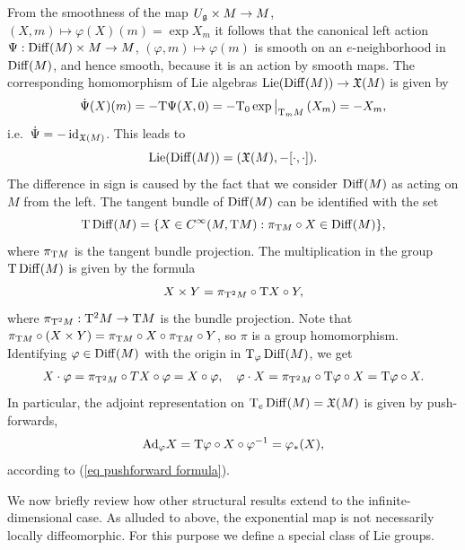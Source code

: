 \begin{example}
    From the smoothness of the map $U_{\mathfrak{g}}\times M\to M$, $(X,m)\mapsto \varphi(X)(m)=\exp X_m$ it follows that the canonical left action $\Psi:\operatorname{Diff}(M)\times M\to M$, $(\varphi,m)\mapsto \varphi(m)$ is smooth on an $e$-neighborhood in $\operatorname{Diff}(M)$, and hence smooth, because it is an action by smooth maps. The corresponding homomorphism of Lie algebras $\operatorname{Lie}(\operatorname{Diff}(M))\to \mathfrak{X}(M)$ is given by
    \[\dot\Psi(X)(m)=-\T\Psi (X,0)=-\T_{0}\restr{\exp}{\T_m M}(X_m)=-X_m,\]
    i.e.\ $\dot\Psi=-\operatorname{id}_{\mathfrak{X}(M)}$. This leads to
    \[\operatorname{Lie} (\operatorname{Diff}(M))=(\mathfrak{X}(M),-[\cdot,\cdot]).\]
    The difference in sign is caused by the fact that we consider $\operatorname{Diff}(M)$ as acting on $M$ from the left. The tangent bundle of $\operatorname{Diff}(M)$ can be identified with the set
    \[\mathrm{T}\operatorname{Diff}(M)=\{X\in C^\infty(M,\mathrm{T} M):\pi_{\mathrm{T} M}\circ X\in \operatorname{Diff}(M)\},\]
    where $\pi_{\mathrm{T} M}$ is the tangent bundle projection. The multiplication in the group $\mathrm{T}\operatorname{Diff}(M)$ is given by the formula
    \[X\times Y=\pi_{\mathrm{T}^2M}\circ \mathrm{T} X\circ Y,\]
    where $\pi_{\mathrm{T}^2M}:\mathrm{T}^2M\to \mathrm{T} M$ is the bundle projection. Note that $\pi_{\mathrm{T} M}\circ (X\times Y)=\pi_{\mathrm{T} M}\circ X\circ \pi_{\mathrm{T} M}\circ Y$, so $\pi$ is a group homomorphism. Identifying $\varphi\in\operatorname{Diff}(M)$ with the origin in $\mathrm{T}_\varphi\operatorname{Diff}(M)$, we get 
    \[X\cdot \varphi=\pi_{\mathrm{T}^2M}\circ TX\circ \varphi=X\circ \varphi,\quad \varphi\cdot X=\pi_{\mathrm{T}^2M}\circ \mathrm{T}\varphi\circ X=\mathrm{T}\varphi\circ X.\]
    In particular, the adjoint representation on $\mathrm{T}_e\operatorname{Diff}(M)=\mathfrak{X}(M)$ is given by push-forwards,
    \[\mathrm{Ad}_\varphi X=\mathrm{T}\varphi\circ X\circ \varphi^{-1}=\varphi_\ast (X),\]
    according to (\ref{eq pushforward formula}).
\end{example}


We now briefly review how other structural results extend to the infinite-dimensional case. As alluded to above, the exponential map is not necessarily locally diffeomorphic. For this purpose we define a special class of Lie groups.

